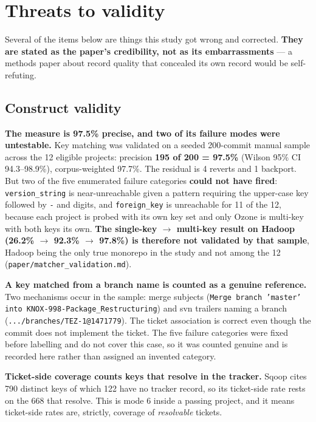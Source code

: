 \documentclass[11pt,a4paper]{article}
\begin{document}
\section{Threats to validity}
\label{sec:6}

Several of the items below are things this study got wrong and corrected. \textbf{They are stated as the paper's credibility, not as its embarrassments} --- a methods paper about record quality that concealed its own record would be self-refuting.

\subsection{Construct validity}
\label{sec:6.1}

\textbf{The measure is 97.5\% precise, and two of its failure modes were untestable.} Key matching was validated on a seeded 200-commit manual sample across the 12 eligible projects: precision \textbf{195 of 200 = 97.5\%} (Wilson 95\% CI 94.3--98.9\%), corpus-weighted 97.7\%. The residual is 4 reverts and 1 backport. But two of the five enumerated failure categories \textbf{could not have fired}: \texttt{version\_\allowbreak{}string} is near-unreachable given a pattern requiring the upper-case key followed by \texttt{-\allowbreak{}} and digits, and \texttt{foreign\_\allowbreak{}key} is unreachable for 11 of the 12, because each project is probed with its own key set and only Ozone is multi-key with both keys its own. \textbf{The single-key $\rightarrow$ multi-key result on Hadoop (26.2\% $\rightarrow$ 92.3\% $\rightarrow$ 97.8\%) is therefore not validated by that sample}, Hadoop being the only true monorepo in the study and not among the 12 (\texttt{paper/\allowbreak{}matcher\_\allowbreak{}validation.\allowbreak{}md}).

\textbf{A key matched from a branch name is counted as a genuine reference.} Two mechanisms occur in the sample: merge subjects (\texttt{Merge branch 'master' into KNOX-\allowbreak{}998-\allowbreak{}Package\_\allowbreak{}Restructuring}) and svn trailers naming a branch (\texttt{.\allowbreak{}.\allowbreak{}.\allowbreak{}/\allowbreak{}branches/\allowbreak{}TEZ-\allowbreak{}1@1471779}). The ticket association is correct even though the commit does not implement the ticket. The five failure categories were fixed before labelling and do not cover this case, so it was counted genuine and is recorded here rather than assigned an invented category.

\textbf{Ticket-side coverage counts keys that resolve in the tracker.} Sqoop cites 790 distinct keys of which 122 have no tracker record, so its ticket-side rate rests on the 668 that resolve. This is mode 6 inside a passing project, and it means ticket-side rates are, strictly, coverage of \emph{resolvable} tickets.
\end{document}
